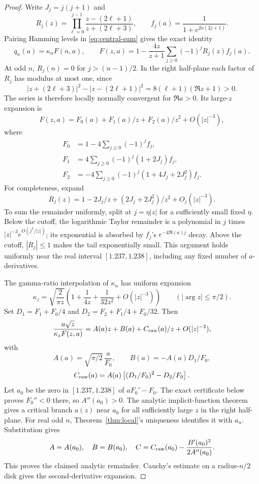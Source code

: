 \documentclass[11pt]{article}
\theoremstyle{remark}\newtheorem{remark}[theorem]{Remark}
\begin{document}
\begin{proof}
Write $J_j=j(j+1)$ and
\[
 R_j(z)=\prod_{\ell=0}^{j-1}\frac{z-(2\ell+1)}{z+(2\ell+3)},
 \qquad f_j(a)=\frac1{1+e^{2a(2j+1)}}.
\]
Pairing Hamming levels in \eqref{eq:central-sum} gives the exact identity
\begin{equation}\label{eq:Finterpolation}
 q_n(a)=\kappa_n F(n,a),\qquad
 F(z,a)=1-\frac{4z}{z+1}\sum_{j\ge0}(-1)^jR_j(z)f_j(a).
\end{equation}
At odd $n$, $R_j(n)=0$ for $j>(n-1)/2$. In the right half-plane each
factor of $R_j$ has modulus at most one, since
\[
 |z+(2\ell+3)|^2-|z-(2\ell+1)|^2
 =8(\ell+1)(\Re z+1)>0.
\]
The series is therefore locally normally convergent for $\Re a>0$.
Its large-$z$ expansion is
\[
 F(z,a)=F_0(a)+F_1(a)/z+F_2(a)/z^2+O(|z|^{-3}),
\]
where
\begin{align*}
 F_0&=1-4\sum_{j\ge0}(-1)^jf_j,\\
 F_1&=4\sum_{j\ge0}(-1)^j(1+2J_j)f_j,\\
 F_2&=-4\sum_{j\ge0}(-1)^j(1+4J_j+2J_j^2)f_j.
\end{align*}
For completeness, expand
\[
 R_j(z)=1-2J_j/z+(2J_j+2J_j^2)/z^2+O_j(|z|^{-3}).
\]
To sum the remainder uniformly, split at $j=\eta|z|$ for a sufficiently
small fixed $\eta$. Below the cutoff, the logarithmic Taylor remainder
is a polynomial in $j$ times $|z|^{-3}e^{O(j^2/|z|)}$; its exponential
is absorbed by $f_j$'s $e^{-4\Re(a)j}$ decay. Above the cutoff,
$|R_j|\le1$ makes the tail exponentially small. This argument holds
uniformly near the real interval $[1.237,1.238]$, including any fixed
number of $a$-derivatives.

The gamma-ratio interpolation of $\kappa_n$ has uniform expansion
\[
 \kappa_z=\sqrt{\frac2{\pi z}}
 \left(1+\frac1{4z}+\frac1{32z^2}+O(|z|^{-3})\right)
 \qquad(|\arg z|\le\pi/2).
\]
Set $D_1=F_1+F_0/4$ and $D_2=F_2+F_1/4+F_0/32$. Then
\[
 \frac{a\sqrt z}{\kappa_z F(z,a)}
 =A(a)z+B(a)+C_{\rm raw}(a)/z+O(|z|^{-2}),
\]
with
\[
 A(a)=\sqrt{\pi/2}\,\frac a{F_0},\qquad
 B(a)=-A(a)D_1/F_0,
\]
\[
 C_{\rm raw}(a)=A(a)\left[(D_1/F_0)^2-D_2/F_0\right].
\]
Let $a_0$ be the zero in $[1.237,1.238]$ of $aF_0'-F_0$.
The exact certificate below proves $F_0''<0$ there, so $A''(a_0)>0$.
The analytic implicit-function theorem gives a critical branch $a(z)$
near $a_0$ for all sufficiently large $z$ in the right half-plane.
For real odd $n$, Theorem~\ref{thm:local}'s uniqueness identifies it with
$a_n$. Substitution gives
\begin{equation}\label{eq:Cformula}
 A=A(a_0),\quad B=B(a_0),\quad
 C=C_{\rm raw}(a_0)-\frac{B'(a_0)^2}{2A''(a_0)}.
\end{equation}
This proves the claimed analytic remainder. Cauchy's estimate on a
radius-$n/2$ disk gives the second-derivative expansion.


\end{proof}
\end{document}

